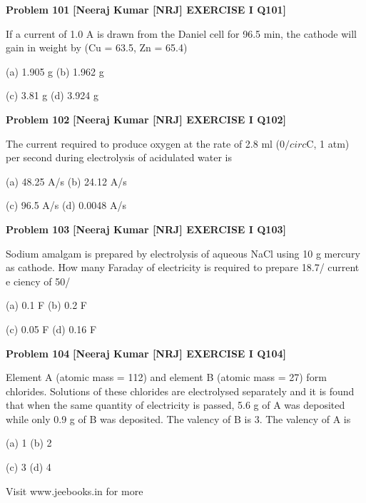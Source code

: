 \begin{problembox}
\textbf{Problem 101} \hfill \textbf{[Neeraj Kumar [NRJ] EXERCISE I Q101]}
\label{q:ext-nrj_all_questions-101}

If a current of 1.0 A is drawn from the Daniel cell 
for 96.5 min, the cathode will gain in weight by 
(Cu = 63.5, Zn = 65.4)
 
 (a) 1.905 g 
(b) 1.962 g
 
 (c) 3.81 g 
(d) 3.924 g
\end{problembox}

\begin{problembox}
\textbf{Problem 102} \hfill \textbf{[Neeraj Kumar [NRJ] EXERCISE I Q102]}
\label{q:ext-nrj_all_questions-102}

The current required to produce oxygen at the 
rate of 2.8 ml  (0$/circ$C, 1 atm) per second during 
electrolysis of acidulated water is
 
 (a) 48.25 A/s 
(b) 24.12 A/s
 
 (c) 96.5 A/s 
(d) 0.0048 A/s
\end{problembox}

\begin{problembox}
\textbf{Problem 103} \hfill \textbf{[Neeraj Kumar [NRJ] EXERCISE I Q103]}
\label{q:ext-nrj_all_questions-103}

Sodium amalgam is prepared by  electrolysis of 
aqueous NaCl using 10 g mercury as cathode. 
How many Faraday of electricity is required to 
prepare 18.7/%
current e   ciency of 50/%
 
 (a) 0.1 F 
(b) 0.2 F
 
 (c) 0.05 F 
(d) 0.16 F
\end{problembox}

\begin{problembox}
\textbf{Problem 104} \hfill \textbf{[Neeraj Kumar [NRJ] EXERCISE I Q104]}
\label{q:ext-nrj_all_questions-104}

Element A (atomic mass = 112) and element B 
(atomic mass = 27) form chlorides. Solutions of 
these chlorides are electrolysed separately and it is 
found that when the same quantity of electricity 
is passed, 5.6 g of A was deposited while only 0.9 
g of B was deposited. The valency of B is 3. The 
valency of A is
 
 (a) 1 
(b) 2
 
 (c) 3 
(d) 4
 
 
Visit www.jeebooks.in for more
\end{problembox}

